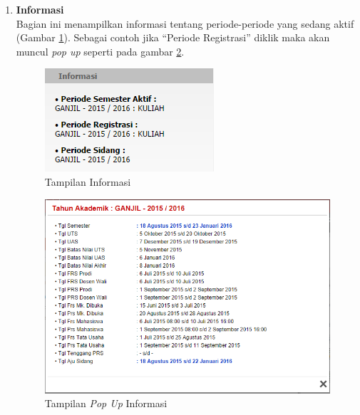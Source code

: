 \documentclass[a4paper,twoside]{article}
\begin{document}
\begin{enumerate}
\begin{enumerate}
\begin{enumerate}
	\item \textbf{Informasi}\\
		Bagian ini menampilkan informasi tentang periode-periode yang sedang aktif (Gambar \ref{fig:3_pam_utama_informasi}). Sebagai contoh jika ``Periode Registrasi'' diklik maka akan muncul \textit{pop up} seperti pada gambar \ref{fig:3_pam_utama_informasipop}.
			\begin{figure}[H]
				\centering
				\includegraphics[scale=0.75]{Gambar/pam-utama-informasi}
				\caption{Tampilan Informasi} 
				\label{fig:3_pam_utama_informasi}
			\end{figure}
			
			\begin{figure}[H]
				\centering
				\includegraphics[scale=0.5]{Gambar/pam-utama-infopop}
				\caption{Tampilan \textit{Pop Up} Informasi} 
				\label{fig:3_pam_utama_informasipop}
			\end{figure}
		

\end{enumerate}
\end{enumerate}
\end{enumerate}
\end{document}

